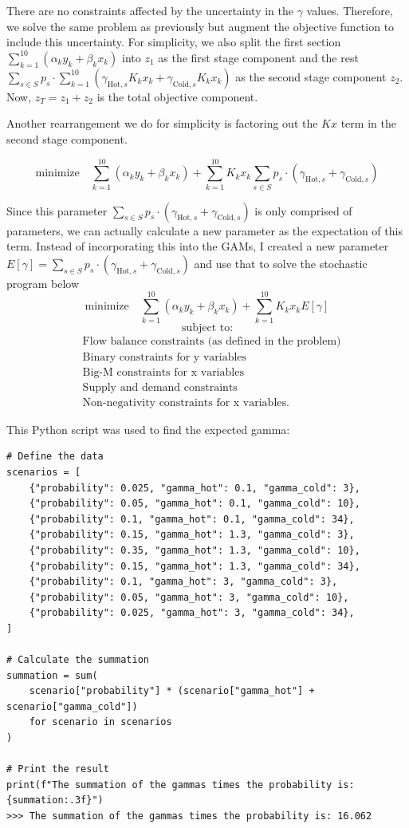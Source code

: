 \documentclass[11pt]{article}
\begin{document}
There are no constraints affected by the uncertainty in the $\gamma$ values.
Therefore, we solve the same problem as previously but augment the objective function to include this uncertainty.
For simplicity, we also split the first section $\sum_{k=1}^{10} \left( \alpha_k y_k + \beta_k x_k \right)$ into $z_1$ as the first stage component and the rest $\sum_{s \in S} p_s \cdot \sum_{k=1}^{10} \left( \gamma_{\text{Hot},s} K_k x_k + \gamma_{\text{Cold},s} K_k x_k \right)$ as the second stage component $z_2$.
Now, $z_T = z_1 + z_2$ is the total objective component.

Another rearrangement we do for simplicity is factoring out the $K x $ term in the second stage component.

\[
    \text{minimize} \quad \sum_{k=1}^{10} \left( \alpha_k y_k + \beta_k x_k \right) + \sum_{k=1}^{10} K_k x_k \sum_{s \in S} p_s \cdot  \left( \gamma_{\text{Hot},s}  + \gamma_{\text{Cold},s} \right)
\]

Since this parameter $\sum_{s \in S} p_s \cdot  \left( \gamma_{\text{Hot},s}  + \gamma_{\text{Cold},s} \right)$ is only comprised of parameters, we can actually calculate a new parameter as the expectation of this term.
Instead of incorporating this into the GAMs, I created a new parameter $E[\gamma] = \sum_{s \in S} p_s \cdot  \left( \gamma_{\text{Hot},s}  + \gamma_{\text{Cold},s} \right)$ and use that to solve the stochastic program below
\[
    \text{minimize} \quad \sum_{k=1}^{10} \left( \alpha_k y_k + \beta_k x_k \right) + \sum_{k=1}^{10} K_k x_k E[\gamma]
\]
\[
\text{subject to:}
\]
\[
\begin{aligned}
    & \text{Flow balance constraints (as defined in the problem)} \\
    & \text{Binary constraints for y variables} \\
    & \text{Big-M constraints for x variables} \\
    & \text{Supply and demand constraints} \\
    & \text{Non-negativity constraints for x variables.}
\end{aligned}
\]

This Python script was used to find the expected gamma:
\begin{verbatim}
# Define the data
scenarios = [
    {"probability": 0.025, "gamma_hot": 0.1, "gamma_cold": 3},
    {"probability": 0.05, "gamma_hot": 0.1, "gamma_cold": 10},
    {"probability": 0.1, "gamma_hot": 0.1, "gamma_cold": 34},
    {"probability": 0.15, "gamma_hot": 1.3, "gamma_cold": 3},
    {"probability": 0.35, "gamma_hot": 1.3, "gamma_cold": 10},
    {"probability": 0.15, "gamma_hot": 1.3, "gamma_cold": 34},
    {"probability": 0.1, "gamma_hot": 3, "gamma_cold": 3},
    {"probability": 0.05, "gamma_hot": 3, "gamma_cold": 10},
    {"probability": 0.025, "gamma_hot": 3, "gamma_cold": 34},
]

# Calculate the summation
summation = sum(
    scenario["probability"] * (scenario["gamma_hot"] + scenario["gamma_cold"])
    for scenario in scenarios
)

# Print the result
print(f"The summation of the gammas times the probability is: {summation:.3f}")
>>> The summation of the gammas times the probability is: 16.062
\end{verbatim}
\end{document}
